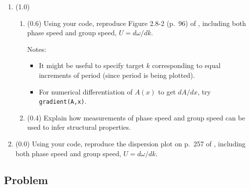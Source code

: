 \documentclass[11pt,titlepage,fleqn]{article}
\begin{document}
\begin{enumerate}
\begin{enumerate}
\end{enumerate}


\item (1.0)
%
\begin{enumerate}
\item (0.6) Using your code, reproduce Figure 2.8-2 (p.~96) of \citet{SteinWysession}, including both phase speed and group speed, $U = d\omega/dk$.

Notes:
%
\begin{itemize}
\item It might be useful to specify target $k$ corresponding to equal increments of period (since period is being plotted).
\item For numerical differentiation of $A(x)$ to get $dA/dx$, try \verb+gradient(A,x)+.
\end{itemize}

\item (0.4) Explain how measurements of phase speed and group speed can be used to infer structural properties.
\end{enumerate}


\item (0.0) Using your code, reproduce the dispersion plot on p.~257 of \citet{AkiRichardsE2}, including both phase speed and group speed, $U = d\omega/dk$.


\end{enumerate}


\pagebreak
\subsection*{Problem} \howmuchtime\







\end{document}
